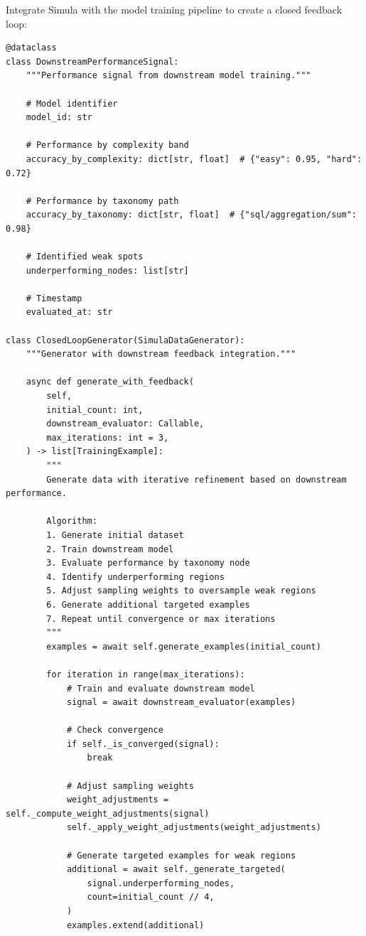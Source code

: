 Integrate Simula with the model training pipeline to create a closed feedback loop:

\begin{lstlisting}[language=jsonx,caption={Closed-loop validation architecture.}]
@dataclass
class DownstreamPerformanceSignal:
    """Performance signal from downstream model training."""
    
    # Model identifier
    model_id: str
    
    # Performance by complexity band
    accuracy_by_complexity: dict[str, float]  # {"easy": 0.95, "hard": 0.72}
    
    # Performance by taxonomy path
    accuracy_by_taxonomy: dict[str, float]  # {"sql/aggregation/sum": 0.98}
    
    # Identified weak spots
    underperforming_nodes: list[str]
    
    # Timestamp
    evaluated_at: str

class ClosedLoopGenerator(SimulaDataGenerator):
    """Generator with downstream feedback integration."""
    
    async def generate_with_feedback(
        self,
        initial_count: int,
        downstream_evaluator: Callable,
        max_iterations: int = 3,
    ) -> list[TrainingExample]:
        """
        Generate data with iterative refinement based on downstream performance.
        
        Algorithm:
        1. Generate initial dataset
        2. Train downstream model
        3. Evaluate performance by taxonomy node
        4. Identify underperforming regions
        5. Adjust sampling weights to oversample weak regions
        6. Generate additional targeted examples
        7. Repeat until convergence or max iterations
        """
        examples = await self.generate_examples(initial_count)
        
        for iteration in range(max_iterations):
            # Train and evaluate downstream model
            signal = await downstream_evaluator(examples)
            
            # Check convergence
            if self._is_converged(signal):
                break
            
            # Adjust sampling weights
            weight_adjustments = self._compute_weight_adjustments(signal)
            self._apply_weight_adjustments(weight_adjustments)
            
            # Generate targeted examples for weak regions
            additional = await self._generate_targeted(
                signal.underperforming_nodes,
                count=initial_count // 4,
            )
            examples.extend(additional)
        

\end{lstlisting}
